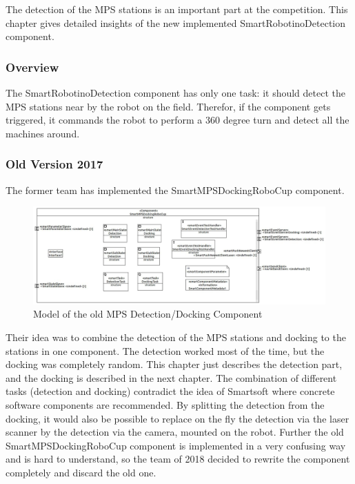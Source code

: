 The detection of the MPS stations is an important part at the competition. This chapter gives detailed insights of the new implemented SmartRobotinoDetection component. 


\subsubsection{Overview}

The SmartRobotinoDetection component has only one task: it should detect the MPS stations near by the robot on the field. Therefor, if the component gets triggered, it commands the robot to perform a 360 degree turn and detect all the machines around.

\subsubsection{Old Version 2017}
The former team has implemented the SmartMPSDockingRoboCup component. 

\begin{figure}[h]
\centering
\includegraphics[scale=0.4]{pic/SmartMPSDockingRoboCup.jpg}
\caption{Model of the old MPS Detection/Docking Component}
\label{fig:dockingold_overview}
\end{figure}

Their idea was to combine the detection of the MPS stations and docking to the stations in one component. The detection worked most of the time, but the docking was completely random. This chapter just describes the detection part, and the docking is described in the next chapter. 
The combination of different tasks (detection and docking) contradict the idea of Smartsoft where concrete software components are recommended. By splitting the detection from the docking, it would also be possible to replace on the fly the detection via the laser scanner by the detection via the camera, mounted on the robot.
Further the old SmartMPSDockingRoboCup component is implemented in a very confusing way and is hard to understand, so the team of 2018 decided to rewrite the component completely and discard the old one.


